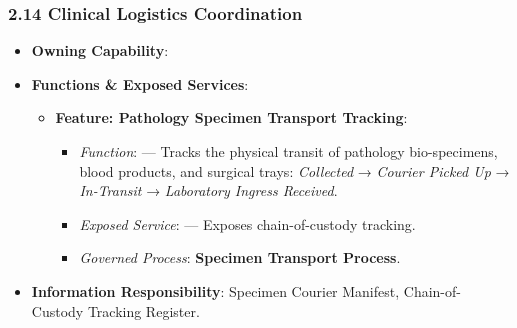 \par\smallskip
{}\label{rad:hso:261}



\label{rad:hso:263}
\subsubsection*{2.14 Clinical Logistics Coordination}
\label{rad:hso:264}

\begin{itemize}

\item 
\textbf{Owning Capability}: \texttt{}



\item 
\textbf{Functions \& Exposed Services}:


\begin{itemize}

\item 
\textbf{Feature: Pathology Specimen Transport Tracking}:


\begin{itemize}

\item 
\emph{Function}: \texttt{} — Tracks the physical transit of pathology bio-specimens, blood products, and surgical trays: \emph{Collected} → \emph{Courier Picked Up} → \emph{In-Transit} → \emph{Laboratory Ingress Received}.



\item 
\emph{Exposed Service}: \texttt{} — Exposes chain-of-custody tracking.



\item 
\emph{Governed Process}: \textbf{Specimen Transport Process}.



\end{itemize}


\end{itemize}


\item 
\textbf{Information Responsibility}: Specimen Courier Manifest, Chain-of-Custody Tracking Register.



\end{itemize}
\label{rad:hso:272}

